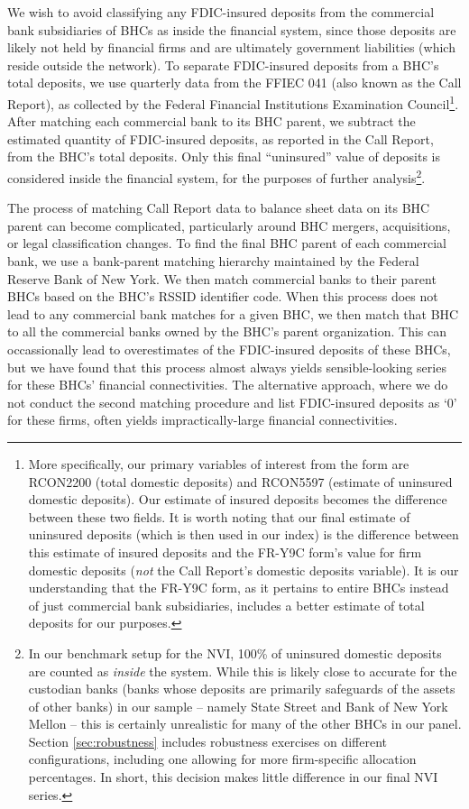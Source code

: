 We wish to avoid classifying any FDIC-insured deposits from the commercial bank subsidiaries of BHCs as inside the financial system, since those deposits are likely not held by financial firms and are ultimately government liabilities (which reside outside the network). To separate FDIC-insured deposits from a BHC's total deposits, we use quarterly data from the FFIEC 041 (also known as the Call Report), as collected by the Federal Financial Institutions Examination Council\footnote{More specifically, our primary variables of interest from the form are RCON2200 (total domestic deposits) and RCON5597 (estimate of uninsured domestic deposits). Our estimate of insured deposits becomes the difference between these two fields. It is worth noting that our final estimate of uninsured deposits (which is then used in our index) is the difference between this estimate of insured deposits and the FR-Y9C form's value for firm domestic deposits (\textit{not} the Call Report's domestic deposits variable). It is our understanding that the FR-Y9C form, as it pertains to entire BHCs instead of just commercial bank subsidiaries, includes a better estimate of total deposits for our purposes.}. After matching each commercial bank to its BHC parent, we subtract the estimated quantity of FDIC-insured deposits, as reported in the Call Report, from the BHC's total deposits. Only this final ``uninsured'' value of deposits is considered inside the financial system, for the purposes of further analysis\footnote{In our benchmark setup for the NVI, 100\% of uninsured domestic deposits are counted as \textit{inside} the system. While this is likely close to accurate for the custodian banks (banks whose deposits are primarily safeguards of the assets of other banks) in our sample -- namely State Street and Bank of New York Mellon -- this is certainly unrealistic for many of the other BHCs in our panel. Section \ref{sec:robustness} includes robustness exercises on different configurations, including one allowing for more firm-specific allocation percentages. In short, this decision makes little difference in our final NVI series.}.

The process of matching Call Report data to balance sheet data on its BHC parent can become complicated, particularly around BHC mergers, acquisitions, or legal classification changes. To find the final BHC parent of each commercial bank, we use a bank-parent matching hierarchy maintained by the Federal Reserve Bank of New York. We then match commercial banks to their parent BHCs based on the BHC's RSSID identifier code. When this process does not lead to any commercial bank matches for a given BHC, we then match that BHC to all the commercial banks owned by the BHC's parent organization. This can occassionally lead to overestimates of the FDIC-insured deposits of these BHCs, but we have found that this process almost always yields sensible-looking series for these BHCs' financial connectivities. The alternative approach, where we do not conduct the second matching procedure and list FDIC-insured deposits as `0' for these firms, often yields impractically-large financial connectivities.  

